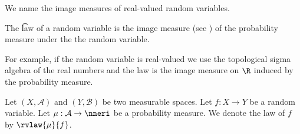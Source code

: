 

We name the image
measures of
real-valued random
variables.


The \t{law} of a random variable is the image measure (see ) of the probability measure under the the random variable.

For example, if the random variable is real-valued we use the topological sigma algebra of the real numbers and the law is the image measure on $\R$ induced by the probability measure.


Let $(X, \mathcal{A})$ and $(Y, \mathcal{B})$ be two measurable spaces.
Let $f: X \to Y$ be a random variable.  Let $\mu: \mathcal{A} \to \nneri$ be a probability measure.
We denote the law of $f$ by $\rvlaw{\mu}{f}$.

\blankpage
